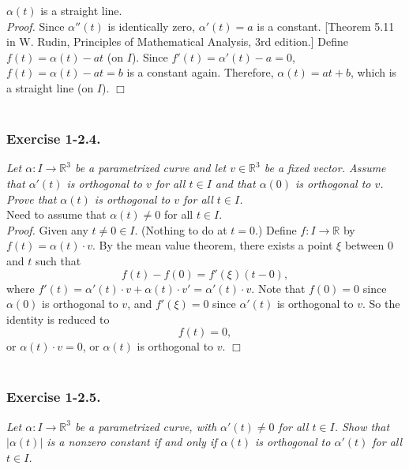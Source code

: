 \documentclass{article}
\begin{document}
$\alpha(t)$ is a straight line. \\



\emph{Proof.}
Since $\alpha''(t)$ is identically zero,
$\alpha'(t) = a$ is a constant.
[Theorem 5.11 in W. Rudin, Principles of Mathematical Analysis, 3rd edition.]
Define $f(t) = \alpha(t) - at$ (on $I$).
Since $f'(t) = \alpha'(t) - a = 0$,
$f(t) = \alpha(t) - at = b$ is a constant again.
Therefore, $\alpha(t) = at+b$, which is a straight line (on $I$).
$\Box$ \\\\






\subsubsection*{Exercise 1-2.4.}
\emph{Let $\alpha: I \to \mathbb{R}^3$ be a parametrized curve and
let $v \in \mathbb{R}^3$ be a fixed vector.
Assume that $\alpha'(t)$ is orthogonal to $v$ for all $t \in I$
and that $\alpha(0)$ is orthogonal to $v$.
Prove that $\alpha(t)$ is orthogonal to $v$ for all $t \in I$.} \\

Need to assume that $\alpha(t) \neq 0$ for all $t \in I$. \\



\emph{Proof.}
Given any $t \neq 0 \in I$. (Nothing to do at $t = 0$.)
Define $f: I \to \mathbb{R}$ by $f(t) = \alpha(t) \cdot v$.
By the mean value theorem, there exists a point $\xi$ between $0$ and $t$
such that
$$f(t) - f(0) = f'(\xi)(t - 0),$$
where $f'(t) = \alpha'(t) \cdot v + \alpha(t) \cdot v' = \alpha'(t) \cdot v$.
Note that $f(0) = 0$ since $\alpha(0)$ is orthogonal to $v$,
and $f'(\xi) = 0$ since $\alpha'(t)$ is orthogonal to $v$.
So the identity is reduced to
$$f(t) = 0,$$
or $\alpha(t) \cdot v = 0$,
or $\alpha(t)$ is orthogonal to $v$.
$\Box$ \\\\






\subsubsection*{Exercise 1-2.5.}
\emph{Let $\alpha: I \to \mathbb{R}^3$ be a parametrized curve,
with $\alpha'(t) \neq 0$ for all $t \in I$.
Show that $|\alpha(t)|$ is a nonzero constant
if and only if
$\alpha(t)$ is orthogonal to $\alpha'(t)$ for all $t \in I$.} \\
\end{document}
